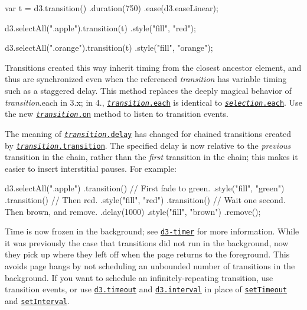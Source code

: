 \begin{DoxyCode}
var t = d3.transition()
    .duration(750)
    .ease(d3.easeLinear);

d3.selectAll(".apple").transition(t)
    .style("fill", "red");

d3.selectAll(".orange").transition(t)
    .style("fill", "orange");
\end{DoxyCode}


Transitions created this way inherit timing from the closest ancestor element, and thus are synchronized even when the referenced {\itshape transition} has variable timing such as a staggered delay. This method replaces the deeply magical behavior of {\itshape transition}.each in 3.\+x; in 4., \href{https://github.com/d3/d3-transition/blob/master/README.md#transition_each}{\tt {\itshape transition}.each} is identical to \href{https://github.com/d3/d3-selection/blob/master/README.md#selection_each}{\tt {\itshape selection}.each}. Use the new \href{https://github.com/d3/d3-transition/blob/master/README.md#transition_on}{\tt {\itshape transition}.on} method to listen to transition events.

The meaning of \href{https://github.com/d3/d3-transition/blob/master/README.md#transition_delay}{\tt {\itshape transition}.delay} has changed for chained transitions created by \href{https://github.com/d3/d3-transition/blob/master/README.md#transition_transition}{\tt {\itshape transition}.transition}. The specified delay is now relative to the {\itshape previous} transition in the chain, rather than the {\itshape first} transition in the chain; this makes it easier to insert interstitial pauses. For example\+:


\begin{DoxyCode}
d3.selectAll(".apple")
  .transition() // First fade to green.
    .style("fill", "green")
  .transition() // Then red.
    .style("fill", "red")
  .transition() // Wait one second. Then brown, and remove.
    .delay(1000)
    .style("fill", "brown")
    .remove();
\end{DoxyCode}


Time is now frozen in the background; see \href{#timers-d3-timer}{\tt d3-\/timer} for more information. While it was previously the case that transitions did not run in the background, now they pick up where they left off when the page returns to the foreground. This avoids page hangs by not scheduling an unbounded number of transitions in the background. If you want to schedule an infinitely-\/repeating transition, use transition events, or use \href{https://github.com/d3/d3-timer/blob/master/README.md#timeout}{\tt d3.\+timeout} and \href{https://github.com/d3/d3-timer/blob/master/README.md#interval}{\tt d3.\+interval} in place of \href{https://developer.mozilla.org/en-US/docs/Web/API/WindowTimers/setTimeout}{\tt set\+Timeout} and \href{https://developer.mozilla.org/en-US/docs/Web/API/WindowTimers/setInterval}{\tt set\+Interval}.

